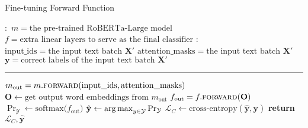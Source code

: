 \begin{algorithm}
\caption{Fine-tuning Forward Function}\label{alg:fine-tune-forward}

\begin{algorithmic}[1] 
\small
\Require $\boldsymbol{:}$ \newline $m = \text{the pre-trained RoBERTa-Large model}$ \newline $f = \text{extra linear layers to serve as the final classifier}$
\Ensure $\boldsymbol{:}$ \newline $\text{input\_ids} = \text{the input text batch }\mathbf{X}'$ \newline
    $\text{attention\_masks} = \text{the input text batch }\mathbf{X}' $   \newline
    $\mathbf{y} = \text{correct labels of the input text batch }\mathbf{X}'$ 
\vspace{0.3em}
\hrule
\vspace{0.3em}
\State $m_\text{out} = m.\Call{\text{forward}}{\text{input\_ids}, \text{attention\_masks}}$
\State $\textbf{O} \gets \text{get output word embeddings from $m_\text{out}$}$  
 {\color{mylightgrey}}
\State $f_\text{out} = f.\Call{\text{forward}}{\textbf{O}}$
{\color{mylightgrey}}
\State $\Pr_{\mathcal{Y}} \gets \text{softmax($f_\text{out}$)}$
{\color{mylightgrey}}
\State $\hat{\mathbf{y}} \gets \operatorname*{arg\,max}_{y \in \mathcal{Y}} \Pr_{\mathcal{Y}}$
{\color{mylightgrey}}
\State $\mathcal{L}_C \gets \text{cross-entropy}(\hat{\mathbf{y}},\mathbf{y})$
{\color{mylightgrey}}
\State \textbf{return $\mathcal{L}_C, \hat{\mathbf{y}}$}
{\color{mylightgrey}}
\EndFunction
\end{algorithmic}
\end{algorithm}

